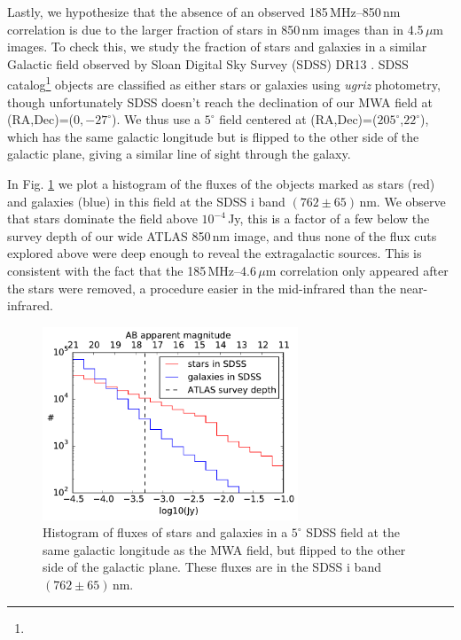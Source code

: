 \documentclass[numberedappendix]{emulateapj}
\begin{document}
Lastly, we hypothesize that the absence of an observed 185\,MHz--850\,nm correlation is due to the larger fraction of stars in 850\,nm images than in 4.5\,$\mu$m images. To check this, we study the fraction of stars and galaxies in a similar Galactic field observed by Sloan Digital Sky Survey (SDSS) \citep{sdssiii} DR13 \citep{sdssdr13}. SDSS catalog\footnote{} objects are classified as either stars or galaxies using \textit{ugriz} photometry, though unfortunately SDSS doesn't reach the declination of our MWA field at (RA,Dec)=($0,-27^\circ$). We thus use a $5^\circ$ field centered at (RA,Dec)=($205^\circ$,$22^\circ$), which has the same galactic longitude but is flipped to the other side of the galactic plane, giving a similar line of sight through the galaxy.

In Fig. \ref{fig:sdssstarsgals} we plot a histogram of the fluxes of the objects marked as stars (red) and galaxies (blue) in this field at the SDSS i band $(762\pm65)$\,nm. We observe that stars dominate the field above  $10^{-4}$\,Jy, this is a factor of a few below the survey depth of our wide ATLAS 850\,nm image, and thus none of the flux cuts explored above were deep enough to reveal the extragalactic sources. This is consistent with the fact that the 185\,MHz--4.6\,$\mu$m correlation only appeared after the stars were removed, a procedure easier in the mid-infrared than the near-infrared. 

\begin{figure}[h]
\centering
\includegraphics[width=3in]{sdss_stars_galaxies_hist_l=15_b=78_500000sources.pdf}
\caption[Histogram of SDSS fluxes of stars and galaxies in a similar field to our ATLAS field.]{Histogram of fluxes of stars and galaxies in a $5^\circ$ SDSS field at the same galactic longitude as the MWA field, but flipped to the other side of the galactic plane. These fluxes are in the SDSS i band $(762\pm65)$\,nm. }
\label{fig:sdssstarsgals}
\end{figure}
\end{document}
